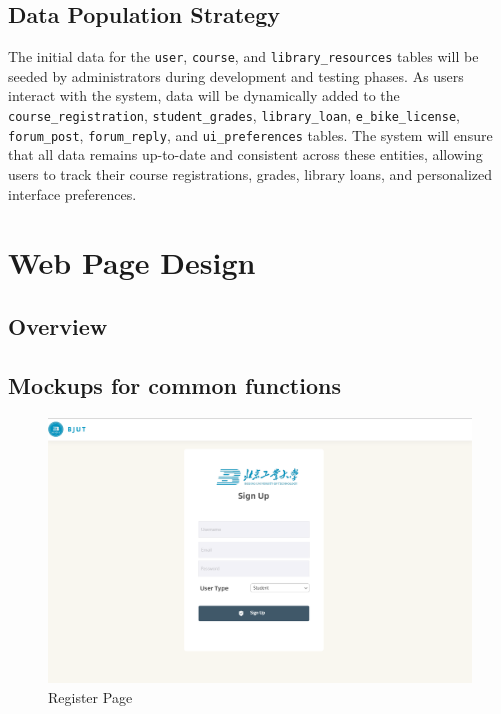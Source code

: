 \documentclass[12pt]{article}
\begin{document}
\subsection{Data Population Strategy}
The initial data for the \texttt{user}, \texttt{course}, and \texttt{library\_resources}
tables will be seeded by administrators during development and testing phases. As users
interact with the system, data will be dynamically added to the \texttt{course\_registration},
\texttt{student\_grades}, \texttt{library\_loan}, \texttt{e\_bike\_license}, \texttt{forum\_post},
\texttt{forum\_reply}, and \texttt{ui\_preferences} tables. The system will ensure that all data
remains up-to-date and consistent across these entities, allowing users to track their course
registrations, grades, library loans, and personalized interface preferences.

\newpage
\section{Web Page Design}
\subsection{Overview}

\subsection{Mockups for common functions}

\begin{figure}[H]
    \centering
    \includegraphics[width=\textwidth]{mockups/common/register.png}
    \caption{Register Page}
    \label{fig:register_page}
\end{figure}
\end{document}
